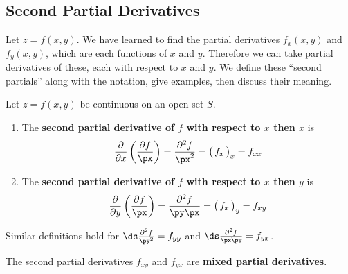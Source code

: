 \subsection*{Second Partial Derivatives}

Let $z=f(x,y)$. We have learned to find the partial derivatives $f_x(x,y)$ and $f_y(x,y)$, which are each functions of $x$ and $y$. Therefore we can take partial derivatives of these, each with respect to $x$ and $y$. We define these ``second partials'' along with the notation, give examples, then discuss their meaning.

{Let $z=f(x,y)$ be continuous on an open set $S$.
\begin{enumerate}
	\item The \textbf{second partial derivative of $f$ with respect to $x$ then $x$} is
	\[\frac{\partial}{\partial x}\left(\frac{\partial f}{\px}\right) = \frac{\partial^2 f}{\px^2} = \big(\,f_x\,\big)_x = f_{xx}\]

\item The \textbf{second partial derivative of $f$ with respect to $x$ then $y$} is 
\[\frac{\partial}{\partial y}\left(\frac{\partial f}{\px}\right) = \frac{\partial^2f}{\py\px} = \big(\,f_x\,\big)_y = f_{xy}\]

%

\end{enumerate}

Similar definitions hold for $\ds \frac{\partial^2f}{\py^2} = f_{yy}$ and $\ds \frac{\partial^2f}{\px\py} = f_{yx}$. \bigskip

The second partial derivatives $f_{xy}$ and $f_{yx}$ are \textbf{mixed partial derivatives}.
}


